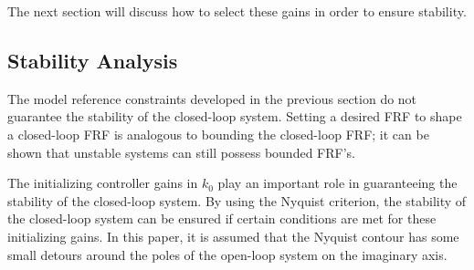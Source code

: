 \documentclass[a4paper, 10pt, conference]{ieeeconf}
\newtheorem{lemma}{Lemma}
\begin{document}
The next section will discuss how to select these gains in order to ensure stability.

\subsection{Stability Analysis}
The model reference constraints developed in the previous section do not guarantee the stability of the closed-loop system. Setting a desired FRF to shape a closed-loop FRF is analogous to bounding the closed-loop FRF; it can be shown that unstable systems can still possess bounded FRF's. 

The initializing controller gains in $k_0$ play an important role in guaranteeing the stability of the closed-loop system. By using the Nyquist criterion, the stability of the closed-loop system can be ensured if certain conditions are met for these initializing gains. In this paper, it is assumed that the Nyquist contour has some small detours around the poles of the open-loop system on the imaginary axis.

\end{document}
